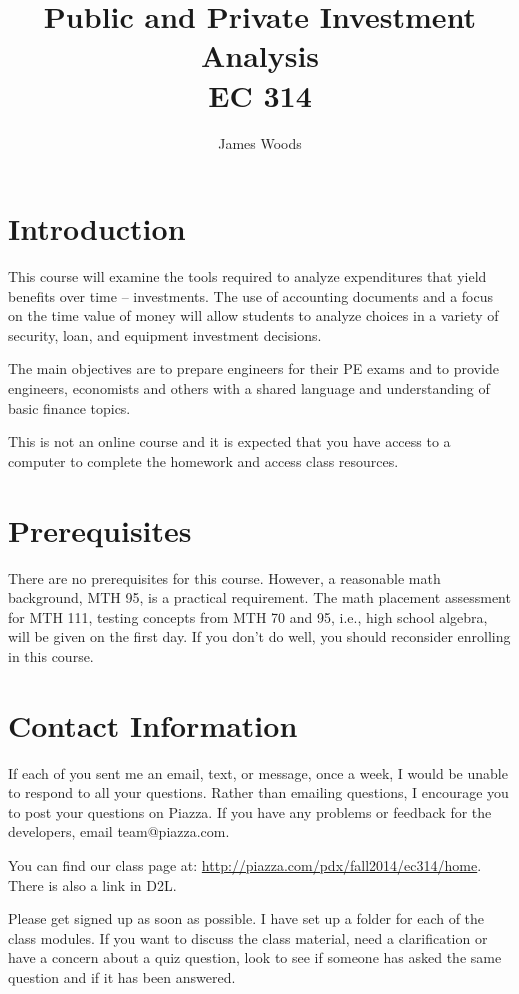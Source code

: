 \documentclass[letterpaper,10pt]{article}
\date{}
\title{Public and Private Investment Analysis\\ 
EC 314\\
\Term}
\author{James Woods}
\newcommand{\Piazza}{\url{http://piazza.com/pdx/fall2014/ec314/home}}
\begin{document}
\maketitle

\section{Introduction}

This course will examine the tools required to analyze expenditures
that yield benefits over time -- investments. The use of accounting
documents and a focus on the time value of money will allow students
to analyze choices in a variety of security, loan, and equipment
investment decisions.

The main objectives are to prepare engineers for their PE exams and to
provide engineers, economists and others with a shared language and
understanding of basic finance topics.

This is not an online course and it is expected that you have access to a
computer to complete the homework and access class resources.  



\section{Prerequisites}

There are no prerequisites for this course. However, a reasonable math
background, MTH 95, is a practical requirement. The math placement assessment for MTH 111, testing concepts from MTH 70 and 95, i.e., high school algebra, will be given on the first day.  If you don't do well, you
should reconsider enrolling in this course.

\section{Contact Information}

If each of you sent me an email, text, or message, once a week, I would be unable to respond to all your questions.  Rather than emailing questions, I encourage you to post your questions on Piazza. If you have any problems or feedback for the developers, email team@piazza.com.

You can find our class page at: \Piazza.  There is also a link in D2L.

Please get signed up as soon as possible. I have set up a
folder for each of the class modules. If you want to discuss the class material, need a clarification or have a concern about a quiz question, look to see if someone has asked the same question and if it has been answered. 
\end{document}
